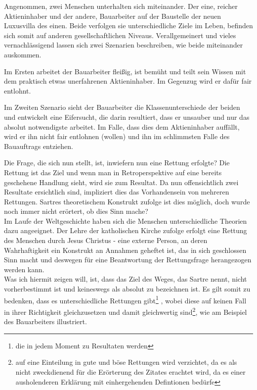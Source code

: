 \documentclass[12pt,a4paper,oneside]{article}
\begin{document}
  
  Angenommen, zwei Menschen unterhalten sich miteinander. Der eine, reicher Aktieninhaber und der andere, Bauarbeiter auf der Baustelle der neuen Luxusvilla des einen. Beide verfolgen sie unterschiedliche Ziele im Leben, befinden sich somit auf anderen gesellschaftlichen Niveaus. Verallgemeinert und vieles vernachlässigend lassen sich zwei Szenarien beschreiben, wie beide miteinander auskommen. 
  
  Im Ersten arbeitet der Bauarbeiter fleißig, ist bemüht und teilt sein Wissen mit dem praktisch etwas unerfahrenen Aktieninhaber. Im Gegenzug wird er dafür fair entlohnt. 
  
  Im Zweiten Szenario sieht der Bauarbeiter die Klassenunterschiede der beiden und entwickelt eine Eifersucht, die darin resultiert, dass er unsauber und nur das absolut notwendigste arbeitet. Im Falle, dass dies dem Aktieninhaber auffällt, wird er ihn nicht fair entlohnen (wollen) und ihn im schlimmsten Falle des Bauauftrags entziehen.
  
  Die Frage, die sich nun stellt, ist, inwiefern nun eine Rettung erfolgte? Die Rettung ist das Ziel und wenn man in Retroperspektive auf eine bereits geschehene Handlung sieht, wird sie zum Resultat. Da nun offensichtlich zwei Resultate ersichtlich sind, impliziert dies das Vorhandensein von mehreren Rettungen. Sartres theoretischem Konstrukt zufolge ist dies möglich, doch wurde noch immer nicht erörtert, ob dies Sinn mache? \\
  
  Im Laufe der Weltgeschichte haben sich die Menschen unterschiedliche Theorien dazu angeeignet. Der Lehre der katholischen Kirche zufolge erfolgt eine Rettung des Menschen durch Jesus Christus - eine externe Person, an deren Wahrhaftigkeit ein Konstrukt an Annahmen geheftet ist, das in sich geschlossen Sinn macht und deswegen für eine Beantwortung der Rettungsfrage herangezogen werden kann. \\
  
  Was ich hiermit zeigen will, ist, dass das Ziel des Weges, das Sartre nennt, nicht vorherbestimmt ist und keineswegs als absolut zu bezeichnen ist. Es gilt somit zu bedenken, dass es unterschiedliche Rettungen gibt\footnote{die in jedem Moment zu Resultaten werden} , wobei diese auf keinen Fall in ihrer Richtigkeit gleichzusetzen und damit gleichwertig sind\footnote{auf eine Einteilung in gute und böse Rettungen wird verzichtet, da es als nicht zweckdienend für die Erörterung des Zitates erachtet wird, da es einer ausholenderen Erklärung mit einhergehenden Defintionen bedürfe}, wie am Beispiel des Bauarbeiters illustriert. 
  
\end{document}
